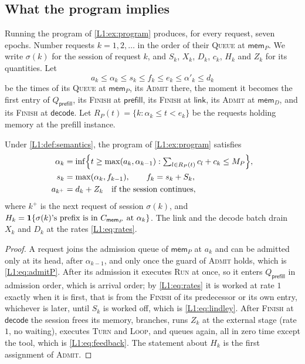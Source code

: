 \subsection{What the program implies}\label{L1:sec:implies}

Running the program of \cref{L1:ex:program} produces, for every request, seven epochs.
Number requests $k=1,2,\dots$ in the order of their \textsc{Queue} at $\mathsf{mem}_P$.
We write $\sigma(k)$ for the session of request $k$, and $S_k$, $X_k$, $D_k$, $c_k$,
$H_k$ and $Z_k$ for its quantities. Let
\[
  a_k\le\alpha_k\le s_k\le f_k\le e_k\le\alpha'_k\le d_k
\]
be the times of its \textsc{Queue} at $\mathsf{mem}_P$, its \textsc{Admit} there, the
moment it becomes the first entry of $Q_{\mathsf{prefill}}$, its \textsc{Finish} at
$\mathsf{prefill}$, its \textsc{Finish} at $\mathsf{link}$, its \textsc{Admit} at
$\mathsf{mem}_D$, and its \textsc{Finish} at $\mathsf{decode}$. Let
$R_P(t)=\{k:\alpha_k\le t<e_k\}$ be the requests holding memory at the prefill
instance.

\begin{lemma}\label{L1:lem:paths}
Under \cref{L1:def:semantics}, the program of \cref{L1:ex:program} satisfies
\begin{align}
  \alpha_k&=\inf\Bigl\{t\ge\max(a_k,\alpha_{k-1}):
      \textstyle\sum_{l\in R_P(t)}c_l+c_k\le M_P\Bigr\},\label{L1:eq:admitP}\\
  s_k&=\max(\alpha_k,f_{k-1}),\qquad f_k=s_k+S_k,\label{L1:eq:lindley}\\
  a_{k^+}&=d_k+Z_k\quad\text{if the session continues},\label{L1:eq:feedback}
\end{align}
where $k^+$ is the next request of session $\sigma(k)$, and
$H_k=\mathbf{1}\{\sigma(k)\text{'s prefix is in }C_{\mathsf{mem}_P}\text{ at }\alpha_k\}$.
The link and the decode batch drain $X_k$ and $D_k$ at the rates \eqref{L1:eq:rates}.
\end{lemma}

\begin{proof}
A request joins the admission queue of $\mathsf{mem}_P$ at $a_k$ and can be admitted
only at its head, after $\alpha_{k-1}$, and only once the guard of \textsc{Admit}
holds, which is \eqref{L1:eq:admitP}. After its admission it executes \textsc{Run} at
once, so it enters $Q_{\mathsf{prefill}}$ in admission order, which is arrival order;
by \eqref{L1:eq:rates} it is worked at rate $1$ exactly when it is first, that is from
the \textsc{Finish} of its predecessor or its own entry, whichever is later, until
$S_k$ is worked off, which is \eqref{L1:eq:lindley}. After \textsc{Finish} at
$\mathsf{decode}$ the session frees its memory, branches, runs $Z_k$ at the external
stage (rate $1$, no waiting), executes \textsc{Turn} and \textsc{Loop}, and queues
again, all in zero time except the tool, which is \eqref{L1:eq:feedback}. The
statement about $H_k$ is the first assignment of \textsc{Admit}.
\end{proof}

